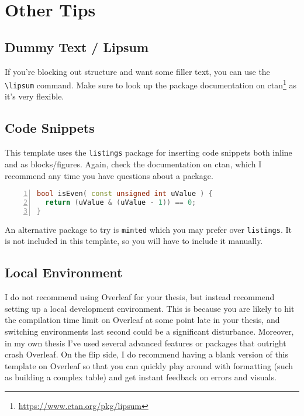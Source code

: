 
\section{Other Tips}%
\label{sec:basics-other}%

\subsection{Dummy Text / Lipsum}%
If you're blocking out structure and want some filler text, you can use the \verb|\lipsum| command.
Make sure to look up the package documentation on ctan\footnote{\url{https://www.ctan.org/pkg/lipsum}} as it's very flexible.

\lipsum[4]


\subsection{Code Snippets}%
This template uses the \verb|listings| package for inserting code snippets both inline and as blocks/figures.
Again, check the documentation on ctan, which I recommend any time you have questions about a package.

\begin{lstlisting}[language=c++, numbers=left, caption={Checking if a number is even using bit magic.}]
bool isEven( const unsigned int uValue ) {
  return (uValue & (uValue - 1)) == 0;
}
\end{lstlisting}

An alternative package to try is \verb|minted| which you may prefer over \verb|listings|.
It is not included in this template, so you will have to include it manually.


\subsection{Local Environment}%
I do not recommend using Overleaf for your thesis, but instead recommend setting up a local development environment.
This is because you are likely to hit the compilation time limit on Overleaf at some point late in your thesis, and switching environments last second could be a significant disturbance.
Moreover, in my own thesis I've used several advanced features or packages that outright crash Overleaf.
On the flip side, I do recommend having a blank version of this template on Overleaf so that you can quickly play around with formatting (such as building a complex table) and get instant feedback on errors and visuals.

